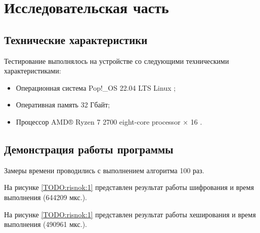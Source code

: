 \section{\large Исследовательская часть}

\subsection{Технические характеристики}

Тестирование выполнялось на устройстве со следующими техническими характеристиками:

\begin{itemize}
	\item Операционная система Pop!\_OS 22.04 LTS \cite{ubuntu} Linux \cite{linux};
	\item Оперативная память 32 Гбайт;
	\item Процессор AMD® Ryzen 7 2700 eight-core processor × 16 \cite{amd}.
\end{itemize}

\subsection{Демонстрация работы программы}

Замеры времени проводились с выполнением алгоритма 100 раз.

На рисунке \ref{TODO:risnok:1} представлен результат работы шифрования и время выполнения (644209 мкс.).

\begin{figure}[ht!]
\end{figure}

На рисунке \ref{TODO:risnok:1} представлен результат работы хеширования и время выполнения (490961 мкс.).

\begin{figure}[ht!]
\end{figure}

